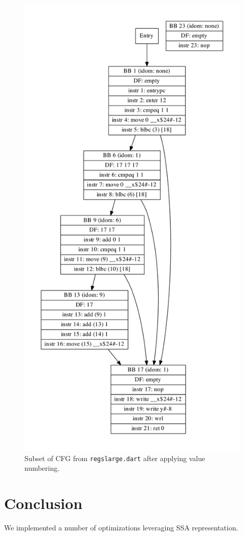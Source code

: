 \documentclass[10pt,twocolumn]{article}
\begin{document}
\begin{figure}
\begin{center}
  \includegraphics[width=0.95\columnwidth]{figs/simple6-postssa.pdf}
\begin{minipage}{0.95\columnwidth}
  \caption{\label{fig:postvn} Subset of CFG from \texttt{regslarge.dart} after applying value numbering.}
\end{minipage}
\end{center}
\end{figure}


\section{Conclusion}

We implemented a number of optimizations leveraging SSA representation.



\end{document}
